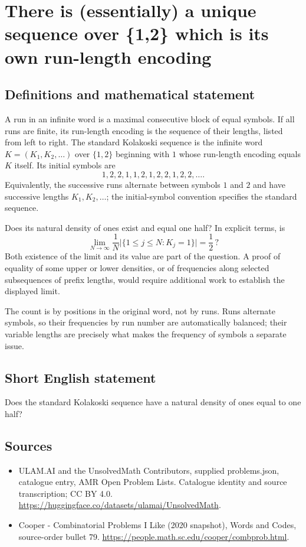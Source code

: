 \documentclass[11pt,a4paper]{article}
\begin{document}
\section*{There is (essentially) a unique sequence over \{1,2\} which is its own run-length encoding}\label{statement}

\subsection{Definitions and mathematical statement}
A run in an infinite word is a maximal consecutive block of
equal symbols. If all runs are finite, its run-length encoding
is the sequence of their lengths, listed from left to right.
The standard Kolakoski sequence is the infinite word
$K=(K_1,K_2,\ldots)$ over $\{1,2\}$ beginning with $1$ whose
run-length encoding equals $K$ itself. Its initial symbols are
\[
                 1,2,2,1,1,2,1,2,2,1,2,2,\ldots.
\]
Equivalently, the successive runs alternate between symbols
$1$ and $2$ and have successive lengths $K_1,K_2,\ldots$;
the initial-symbol convention specifies the standard sequence.

Does its natural density of ones exist and equal one half?
In explicit terms, is
\[
           \lim_{N\to\infty}\frac1N
                  \bigl|\{1\le j\le N:K_j=1\}\bigr|=\frac12\,?
\]
Both existence of the limit and its value are part of the
question. A proof of equality of some upper or lower densities,
or of frequencies along selected subsequences of prefix lengths,
would require additional work to establish the displayed limit.

The count is by positions in the original word, not by runs.
Runs alternate symbols, so their frequencies by run number are
automatically balanced; their variable lengths are precisely
what makes the frequency of symbols a separate issue.
\subsection{Short English statement}
Does the standard Kolakoski sequence have a natural density of ones equal to one half?
\subsection{Sources}
\begin{itemize}
\item[S1] ULAM.AI and the UnsolvedMath Contributors, supplied problems.json, catalogue entry, AMR Open Problem Lists. Catalogue identity and source transcription; CC BY 4.0.
\url{https://huggingface.co/datasets/ulamai/UnsolvedMath}.
\item[S2] Cooper - Combinatorial Problems I Like (2020 snapshot), Words and Codes, source-order bullet 79. 
\url{https://people.math.sc.edu/cooper/combprob.html}.
\end{itemize}
\end{document}
